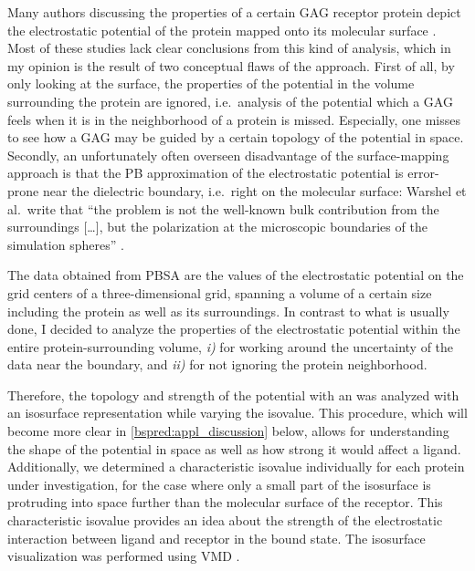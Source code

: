 Many authors discussing the properties of a certain GAG receptor protein depict
the electrostatic potential of the protein mapped onto its molecular surface
\cite{rogers_gag_prot_prot_2011,%
Gandhi01102009,sapay_hs_growthfactors_2011,%
gandhi_bmp_heparin_binding_sites_2012,sost_heparin_2009,%
catK_cs4_crystal_structure_2008,hydrolase_gags_2011,gandhi_structure_2008,%
imberty_gag_prot_carbres_2007,gags_as_polyelectrolytes_2010}. Most of these
studies lack clear conclusions from this kind of analysis, which in my opinion
is the result of two conceptual flaws of the approach. First of all, by only
looking at the surface, the properties of the potential in the volume
surrounding the protein are ignored, i.e.\ analysis of the potential which a GAG
feels when it is in the neighborhood of a protein is missed. Especially, one
misses to see how a GAG may be guided by a certain topology of the potential in
space. Secondly, an unfortunately often overseen disadvantage of the
surface-mapping approach is that the PB approximation of the electrostatic
potential is  error-prone near the dielectric boundary, i.e.\ right
on the molecular surface: Warshel et al.\ write that \enquote{the problem is not
the well-known bulk contribution from the surroundings [\dots], but the
polarization at the microscopic boundaries of the simulation spheres}
\cite{estatic_proteins_warshel_2006}.


The data obtained from PBSA are the values of the electrostatic potential on the
grid centers of a three-dimensional grid, spanning a volume of a certain size
including the protein as well as its surroundings. In contrast to what is
usually done, I decided to analyze the properties of the electrostatic potential
within the entire protein-surrounding volume, \textit{i)} for working around the
uncertainty of the data near the boundary, and \textit{ii)} for not ignoring the
protein neighborhood.

Therefore, the topology and strength of the potential with an was analyzed with
an isosurface representation while varying the isovalue. This procedure, which
will become more clear in \cref{bspred:appl_discussion} below, allows for
understanding the shape of the potential in space as well as how strong it would
affect a ligand. Additionally, we determined a characteristic isovalue
individually for each protein under investigation, for the case where only a
small part of the isosurface is protruding into space further than the molecular
surface of the receptor. This characteristic isovalue provides an idea about the
strength of the electrostatic interaction between ligand and receptor in the
bound state. The isosurface visualization was performed using VMD
\cite{vmd_1996}.


